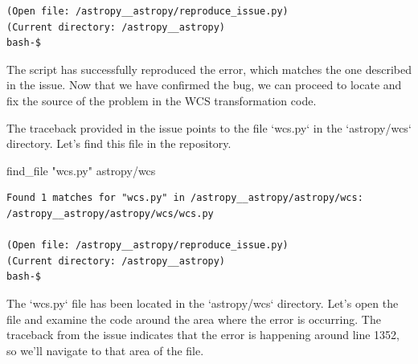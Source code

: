 {\begin{observationbox}
\begin{Verbatim}[breaklines=true, breakanywhere=true]
(Open file: /astropy__astropy/reproduce_issue.py)
(Current directory: /astropy__astropy)
bash-$
\end{Verbatim}
\end{observationbox}
\begin{agentbox}
The script has successfully reproduced the error, which matches the one described in the issue. Now that we have confirmed the bug, we can proceed to locate and fix the source of the problem in the WCS transformation code.



The traceback provided in the issue points to the file `wcs.py` in the `astropy/wcs` directory. Let's find this file in the repository.

\hrulefill
\begin{CodeVerbatim}[breaklines=true, breakanywhere=true]
find_file "wcs.py" astropy/wcs
\end{CodeVerbatim}
\end{agentbox}
\begin{observationbox}\begin{Verbatim}[breaklines=true, breakanywhere=true]
Found 1 matches for "wcs.py" in /astropy__astropy/astropy/wcs:
/astropy__astropy/astropy/wcs/wcs.py

(Open file: /astropy__astropy/reproduce_issue.py)
(Current directory: /astropy__astropy)
bash-$
\end{Verbatim}
\end{observationbox}
\begin{agentbox}
The `wcs.py` file has been located in the `astropy/wcs` directory. Let's open the file and examine the code around the area where the error is occurring. The traceback from the issue indicates that the error is happening around line 1352, so we'll navigate to that area of the file.


\end{agentbox}}
